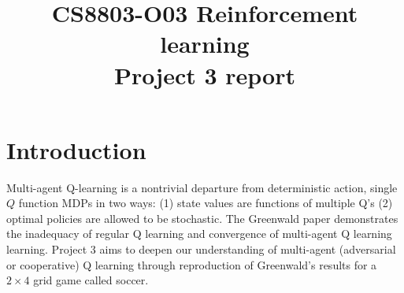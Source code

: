 \documentclass[conference]{IEEEtran}
\begin{document}
\title{CS8803-O03 Reinforcement learning\\Project 3 report}

\author{
}
\maketitle


\IEEEpeerreviewmaketitle
\section{Introduction}
Multi-agent Q-learning is a nontrivial departure from deterministic action, single $Q$ function MDPs in two ways: (1) state values are functions of multiple Q's (2) optimal policies are allowed to be stochastic. The Greenwald paper \cite{greenwald} demonstrates the inadequacy of regular Q learning and convergence of multi-agent Q learning learning. Project 3 aims to deepen our understanding of multi-agent (adversarial or cooperative) Q learning through reproduction of Greenwald's results for a $2\times4$ grid game called soccer.

\end{document}
